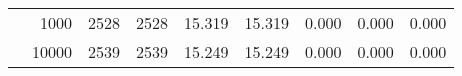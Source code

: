 \begin{table}
\begin{tabular}{rrrrrrrrr}
	            
					 &  
					 
					\multirow{ 1 }{*}{ 1000 } &
					
						
							    
							     2528  & 2528  
	                           & 15.319 & 15.319 & 0.000
	                           & 0.000 & 0.000  \\
	                
	            
					 &  
					 
					\multirow{ 1 }{*}{ 10000 } &
					
						
							    
							     2539  & 2539  
	                           & 15.249 & 15.249 & 0.000
	                           & 0.000 & 0.000  \\
	                
	            
	        

\hline

\end{tabular}
\end{table}
\clearpage


	    

